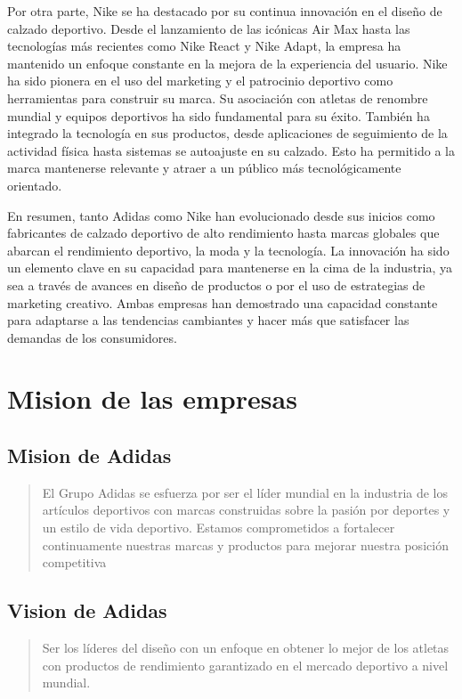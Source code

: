 \documentclass[a4paper,12pt]{article}
\begin{document}
Por otra parte, Nike se ha destacado por su continua innovación en el diseño de calzado deportivo. Desde el lanzamiento de las icónicas Air Max hasta las tecnologías más recientes como Nike React y Nike Adapt, la empresa ha mantenido un enfoque constante en la mejora de la experiencia del usuario.
Nike ha sido pionera en el uso del marketing y el patrocinio deportivo como herramientas para construir su marca. Su asociación con atletas de renombre mundial y equipos deportivos ha sido fundamental para su éxito.
También ha integrado la tecnología en sus productos, desde aplicaciones de seguimiento de la actividad física hasta sistemas se autoajuste en su calzado. Esto ha permitido a la marca mantenerse relevante y atraer a un público más tecnológicamente orientado. \par

En resumen, tanto Adidas como Nike han evolucionado desde sus inicios como fabricantes de calzado deportivo de alto rendimiento hasta marcas globales que abarcan el rendimiento deportivo, la moda y la tecnología. La innovación ha sido un elemento clave en su capacidad para mantenerse en la cima de la industria, ya sea a través de avances en diseño de productos o por el uso de estrategias de marketing creativo. Ambas empresas han demostrado una capacidad constante para adaptarse a las tendencias cambiantes y hacer más que satisfacer las demandas de los consumidores.\par

\clearpage
\section{Mision de las empresas}

\subsection{Mision de Adidas}
\begin{quotation}
	El Grupo Adidas se esfuerza por ser el líder mundial en la industria de los artículos deportivos con marcas construidas sobre la pasión por deportes y un estilo de vida deportivo. Estamos comprometidos a fortalecer continuamente nuestras marcas y productos para mejorar nuestra posición competitiva
\end{quotation}
\subsection{Vision de Adidas}
\begin{quotation}
	Ser los líderes del diseño con un enfoque en obtener lo mejor de los atletas con productos de rendimiento garantizado en el mercado deportivo a nivel mundial.
\end{quotation}
\end{document}
